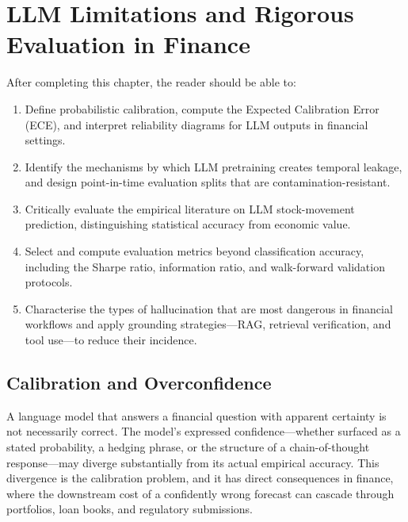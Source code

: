 \chapter{LLM Limitations and Rigorous Evaluation in Finance}
\label{ch:llm-limitations-evaluation}

\begin{remark}
After completing this chapter, the reader should be able to:
\begin{enumerate}
  \item Define probabilistic calibration, compute the Expected Calibration Error (ECE),
        and interpret reliability diagrams for LLM outputs in financial settings.
  \item Identify the mechanisms by which LLM pretraining creates temporal leakage,
        and design point-in-time evaluation splits that are contamination-resistant.
  \item Critically evaluate the empirical literature on LLM stock-movement prediction,
        distinguishing statistical accuracy from economic value.
  \item Select and compute evaluation metrics beyond classification accuracy, including
        the Sharpe ratio, information ratio, and walk-forward validation protocols.
  \item Characterise the types of hallucination that are most dangerous in financial
        workflows and apply grounding strategies---RAG, retrieval verification, and
        tool use---to reduce their incidence.
\end{enumerate}
\end{remark}

\section{Calibration and Overconfidence}
\label{sec:ch13-calibration-overconfidence}

A language model that answers a financial question with apparent certainty is not
necessarily correct. The model's expressed confidence---whether surfaced as a stated
probability, a hedging phrase, or the structure of a chain-of-thought response---may
diverge substantially from its actual empirical accuracy. This divergence is the
calibration problem, and it has direct consequences in finance, where the downstream
cost of a confidently wrong forecast can cascade through portfolios, loan books, and
regulatory submissions.

